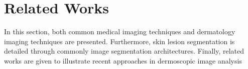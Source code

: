 \chapter{Related Works}
\thispagestyle{empty}

    In this section, both common medical imaging techniques and dermatology imaging techniques are presented.
    Furthermore, skin lesion segmentation is detailed through commonly image segmentation architectures.
    Finally, related works are given to illustrate recent approaches in dermoscopic image analysis

    

    

    
